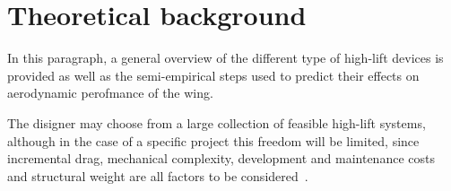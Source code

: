 \begin{table}[!h]
\caption{Comparison between cruise and take-off/landing design requirements}
\label{table:cruiseTOLand}
\end{table}

\section{Theoretical background}
\label{sec:theoryFlapSlat}
In this paragraph, a general overview of the different type of high-lift devices is provided as well as the semi-empirical steps used to predict their effects on aerodynamic perofmance of the wing.

\bigskip
\noindent
The disigner may choose from a large collection of feasible high-lift systems, although in the case of a specific project this freedom will be limited, since incremental drag, mechanical complexity, development and maintenance costs and structural weight are all factors to be considered~\cite{torenbeek1982synthesis}.

